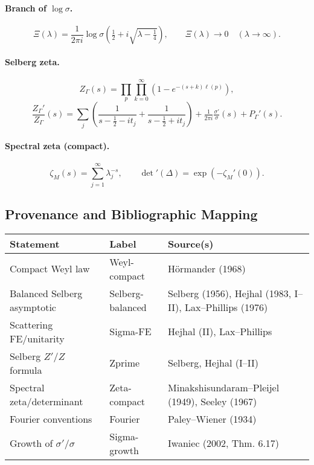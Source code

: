 \paragraph{Branch of $\log\sigma$.}
\[
\Xi(\lambda) = \frac{1}{2\pi i}
\log \sigma\!\left(\tfrac{1}{2}+i\sqrt{\lambda-\tfrac{1}{4}}\right),
\qquad \Xi(\lambda)\to 0\quad (\lambda\to\infty).
\]

\paragraph{Selberg zeta.}
\[
Z_\Gamma(s) = \prod_p \prod_{k=0}^\infty (1-e^{-(s+k)\ell(p)}),
\]
\[
\frac{Z_\Gamma'}{Z_\Gamma}(s) =
\sum_j \left(\frac{1}{s-\tfrac{1}{2}-it_j} + \frac{1}{s-\tfrac{1}{2}+it_j}\right)
+ \tfrac{1}{2\pi i}\tfrac{\sigma'}{\sigma}(s) + P_\Gamma'(s).
\]

\paragraph{Spectral zeta (compact).}
\[
\zeta_M(s) = \sum_{j=1}^\infty \lambda_j^{-s}, 
\qquad
\det{}'(\Delta) = \exp(-\zeta_M'(0)).
\]


\subsection{Provenance and Bibliographic Mapping}

\begin{center}
\renewcommand{\arraystretch}{1.15}
\begin{tabular}{lll}
\toprule
\textbf{Statement} & \textbf{Label} & \textbf{Source(s)} \\
\midrule
Compact Weyl law & Weyl-compact & Hörmander (1968) \\
Balanced Selberg asymptotic & Selberg-balanced & Selberg (1956), Hejhal (1983, I–II), Lax–Phillips (1976) \\
Scattering FE/unitarity & Sigma-FE & Hejhal (II), Lax–Phillips \\
Selberg $Z'/Z$ formula & Zprime & Selberg, Hejhal (I–II) \\
Spectral zeta/determinant & Zeta-compact & Minakshisundaram–Pleijel (1949), Seeley (1967) \\
Fourier conventions & Fourier & Paley–Wiener (1934) \\
Growth of $\sigma'/\sigma$ & Sigma-growth & Iwaniec (2002, Thm. 6.17) \\
\bottomrule
\end{tabular}
\end{center}

